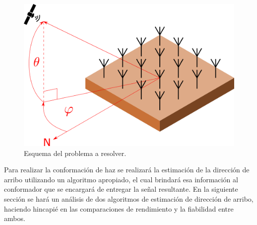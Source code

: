 \begin{figure}[ht!]
    \centering
    \includegraphics[width=0.9\linewidth]{images/02-Beamforming/problem.png}
    \caption{Esquema del problema a resolver.}
    \label{fig:beamforming_problem}
\end{figure}

Para realizar la conformación de haz se realizará la estimación de la dirección de arribo utilizando un algoritmo apropiado, el cual brindará esa información al conformador que se encargará de entregar la señal resultante. En la siguiente sección se hará un análisis de dos algoritmos de estimación de dirección de arribo, haciendo hincapié en las comparaciones de rendimiento y la fiabilidad entre ambos.